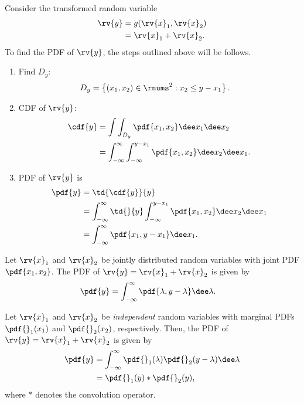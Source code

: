 \begin{example}
    Consider the transformed random variable
    \begin{align}
        \rv{y} &= g(\rv{x}_{1},\rv{x}_{2})\\
        &= \rv{x}_{1} + \rv{x}_{2}.
    \end{align}
    To find the PDF of $\rv{y}$, the steps outlined above will be follows.
    \begin{enumerate}
        \item Find $D_{y}$:
        \begin{align}
            D_{y} &= \left\{ (x_{1},x_{2})\in\rnums^{2} : x_{2} \leq y-x_{1}\right\}.
        \end{align}

        \item CDF of $\rv{y}$:
        \begin{align}
            \cdf{y} 
            &= \int\int_{D_{y}} \pdf{x_{1},x_{2}}\dee x_{1}\dee x_{2}\\
            &= \int_{-\infty}^{\infty}\int_{-\infty}^{y-x_{1}}\pdf{x_{1},x_{2}}\dee x_{2}\dee x_{1}.
        \end{align}
        \item PDF of $\rv{y}$ is
        \begin{align}
            \pdf{y} 
            &= \td{\cdf{y}}{y}\\
            &= \int_{-\infty}^{\infty}\td{}{y}\int_{-\infty}^{y-x_{1}} \pdf{x_{1},x_{2}}\dee x_{2}\dee x_{1}\\
            &= \int_{-\infty}^{\infty}\pdf{x_{1},y-x_{1}}\dee x_{1}.
        \end{align}
    \end{enumerate}
    \triqed
\end{example}

\begin{mytheorem}
       Let $\rv{x}_{1}$ and $\rv{x}_{2}$ be jointly distributed random variables with joint PDF $\pdf{x_{1},x_{2}}$. The PDF of $\rv{y}=\rv{x}_{1} + \rv{x}_{2}$ is given by
       \begin{align}
           \pdf{y} &=
           \int_{-\infty}^{\infty} \pdf{\lambda, y-\lambda} \dee \lambda.
       \end{align}
\end{mytheorem}
\begin{mytheorem}
       Let $\rv{x}_{1}$ and $\rv{x}_{2}$ be \emph{independent} random variables with marginal PDFs $\pdf{}_{1}(x_{1})$ and $\pdf{}_{2}(x_{2})$, respectively. Then, the PDF of $\rv{y}=\rv{x}_{1} + \rv{x}_{2}$ is given by
       \begin{align}
           \pdf{y} &=
           \int_{-\infty}^{\infty} \pdf{}_{1}(\lambda)\pdf{}_{2}(y-\lambda)\dee\lambda\\
           &= \pdf{}_{1}(y)\ast \pdf{}_{2}(y),
       \end{align}
       where $\ast$ denotes the convolution operator.
\end{mytheorem}

